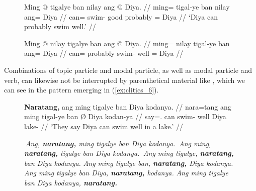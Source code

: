 \begin{figure}[h]
\pex\label{ex:clitics_5}
\a\label{ex:clitics_5a}\begingl
	\gla Ming @ tigalye ban nilay ang @ Diya. //
	\glb ming= tigal-ye ban nilay ang= Diya //
	\glc can= swim-\TsgF{} good probably \Aarg{}= Diya //
	\glft `Diya can probably swim well.' //
\endgl

\a\label{ex:clitics_5b}\ljudge{*}\begingl
	\gla Ming @ nilay tigalye ban ang @ Diya. //
	\glb ming= nilay tigal-ye ban ang= Diya //
	\glc can= probably swim-\TsgF{} well \Aarg{}= Diya //
\endgl
\xe
\end{figure}

Combinations of topic particle and modal particle, as well as modal particle
and verb, can likewise not be interrupted by parenthetical material like
, which we can see in the pattern emerging in
(\ref{ex:clitics_6}).

\begin{figure}[h]
\pex\label{ex:clitics_6}
\a\label{ex:clitics_6a}\begingl
	\gla \textbf{Naratang,} ang ming tigalye ban {} Diya kodanya. //
	\glb nara=tang ang ming tigal-ye ban Ø Diya kodan-ya //
	\glc say=\TplM{}.\Aarg{} \AgtT{} can swim-\TsgF{} well \Top{} Diya 
		lake-\Loc{}	//
	\glft `They say Diya can swim well in a lake.' //
\endgl

\a \ljudge{*} \textit{Ang, \textbf{naratang,} ming tigalye ban Diya kodanya.}
\a \ljudge{*} \textit{Ang ming, \textbf{naratang,} tigalye ban Diya kodanya.}
\a \ljudge{\ques} \textit{Ang ming tigalye, \textbf{naratang,} ban Diya
	kodanya.}
\a \textit{Ang ming tigalye ban, \textbf{naratang,} Diya kodanya.}
\a \textit{Ang ming tigalye ban Diya, \textbf{naratang,} kodanya.}
\a \textit{Ang ming tigalye ban Diya kodanya, \textbf{naratang.}}
\xe
\end{figure}

